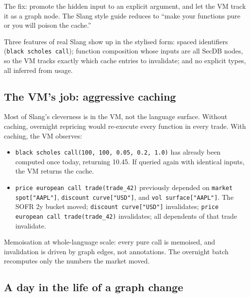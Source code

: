 The fix: promote the hidden input to an explicit argument, and
let the VM track it as a graph node.  The Slang style guide
reduces to ``make your functions pure or you will poison the
cache.''

Three features of real Slang show up in the stylised form: spaced
identifiers (\texttt{black scholes call}); function composition
whose inputs are all SecDB nodes, so the VM tracks exactly which
cache entries to invalidate; and no explicit types, all
inferred from usage.

\subsection{The VM's job: aggressive caching}

Most of Slang's cleverness is in the VM, not the language surface.
Without caching, overnight repricing would re-execute every
function in every trade.  With caching, the VM observes:
\begin{itemize}
  \item \texttt{black scholes call(100, 100, 0.05, 0.2, 1.0)} has
    already been computed once today, returning 10.45.  If
    queried again with identical inputs, the VM returns the cache.
  \item \texttt{price european call trade(trade\_42)} previously
    depended on \texttt{market spot["AAPL"]},
    \texttt{discount curve["USD"]}, and
    \texttt{vol surface["AAPL"]}.  The SOFR 2y bucket moved;
    \texttt{discount curve["USD"]} invalidates;
    \texttt{price european call trade(trade\_42)} invalidates;
    all dependents of that trade invalidate.
\end{itemize}
Memoisation at whole-language scale: every pure call is memoised,
and invalidation is driven by graph edges, not annotations.  The
overnight batch recomputes only the numbers the market moved.

\subsection{A day in the life of a graph change}
\label{sec:day_in_life}

